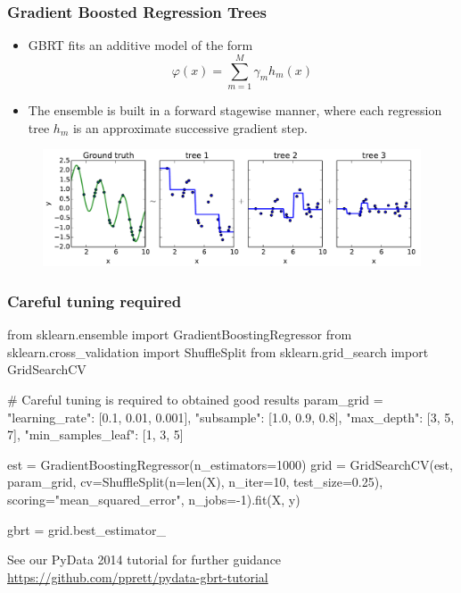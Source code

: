 \documentclass{beamer}
\begin{document}
\begin{frame}
  \frametitle{Gradient Boosted Regression Trees \citep{friedman:2001}}

  \begin{itemize}
  \item GBRT fits an additive model of the form
  $$\varphi(x) =  \sum_{m=1}^M \gamma_m h_m(x)$$

  \item The ensemble is built in a forward stagewise manner, where each
        regression tree $h_m$ is an approximate successive gradient step.
  \end{itemize}

    \begin{figure}
       \centering
       \includegraphics[width=\textwidth]{./figures/residual_fitting_2.pdf}
    \end{figure}

\end{frame}

\begin{frame}[fragile]
  \frametitle{Careful tuning required}

{\scriptsize
\begin{pythoncode}
from sklearn.ensemble import GradientBoostingRegressor
from sklearn.cross_validation import ShuffleSplit
from sklearn.grid_search import GridSearchCV

# Careful tuning is required to obtained good results
param_grid = {"learning_rate": [0.1, 0.01, 0.001],
              "subsample": [1.0, 0.9, 0.8],
              "max_depth": [3, 5, 7],
              "min_samples_leaf": [1, 3, 5]}

est = GradientBoostingRegressor(n_estimators=1000)
grid = GridSearchCV(est, param_grid,
                    cv=ShuffleSplit(n=len(X), n_iter=10, test_size=0.25),
                    scoring="mean_squared_error",
                    n_jobs=-1).fit(X, y)

gbrt = grid.best_estimator_
\end{pythoncode}
}

\begin{center}
See our PyData 2014 tutorial for further guidance
\url{https://github.com/pprett/pydata-gbrt-tutorial}
\end{center}

\end{frame}
\end{document}
